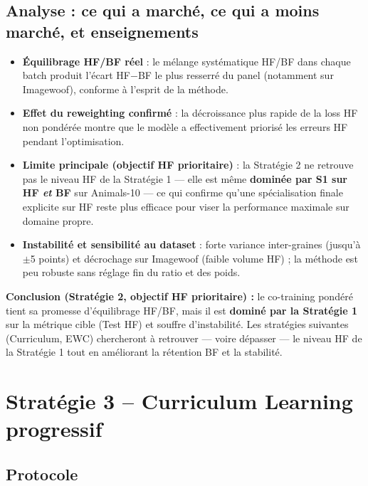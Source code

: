 \documentclass[11pt,a4paper,openany]{book}
\begin{document}
\subsection{Analyse : ce qui a marché, ce qui a moins marché, et enseignements}

\begin{itemize}
  \item \textbf{Équilibrage HF/BF réel} : le mélange systématique HF/BF dans chaque batch produit l'écart HF$-$BF le plus resserré du panel (notamment sur Imagewoof), conforme à l'esprit de la méthode.
  \item \textbf{Effet du reweighting confirmé} : la décroissance plus rapide de la loss HF non pondérée montre que le modèle a effectivement priorisé les erreurs HF pendant l'optimisation.
  \item \textbf{Limite principale (objectif HF prioritaire)} : la Stratégie 2 ne retrouve pas le niveau HF de la Stratégie 1 — elle est même \textbf{dominée par S1 sur HF \emph{et} BF} sur Animals-10 — ce qui confirme qu'une spécialisation finale explicite sur HF reste plus efficace pour viser la performance maximale sur domaine propre.
  \item \textbf{Instabilité et sensibilité au dataset} : forte variance inter-graines (jusqu'à $\pm$5 points) et décrochage sur Imagewoof (faible volume HF) ; la méthode est peu robuste sans réglage fin du ratio et des poids.
\end{itemize}

\begin{decisionbox}
  \textbf{Conclusion (Stratégie 2, objectif HF prioritaire) :} le co-training pondéré tient sa promesse d'équilibrage HF/BF, mais il est \textbf{dominé par la Stratégie 1} sur la métrique cible (Test HF) et souffre d'instabilité. Les stratégies suivantes (Curriculum, EWC) chercheront à retrouver — voire dépasser — le niveau HF de la Stratégie 1 tout en améliorant la rétention BF et la stabilité.
\end{decisionbox}

\section{Stratégie 3 -- Curriculum Learning progressif}

\subsection{Protocole}
\end{document}
